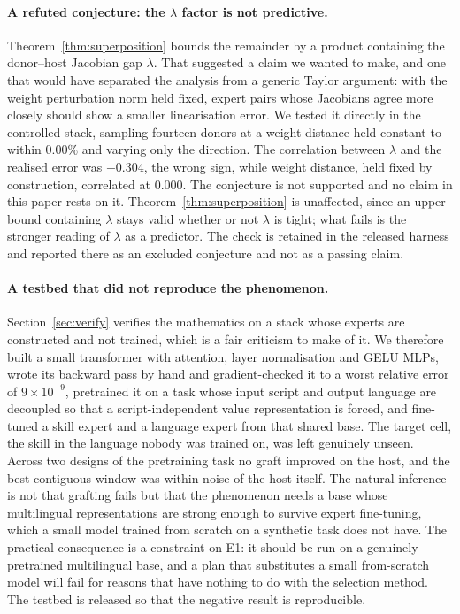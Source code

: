 \documentclass[10pt]{article}
\theoremstyle{plain}
\theoremstyle{definition}
\theoremstyle{remark}
\begin{document}
\paragraph{A refuted conjecture: the $\lambda$ factor is not predictive.}
Theorem~\ref{thm:superposition} bounds the remainder by a product containing the
donor--host Jacobian gap $\lambda$. That suggested a claim we wanted to make, and
one that would have separated the analysis from a generic Taylor argument: with
the weight perturbation norm held fixed, expert pairs whose Jacobians agree more
closely should show a smaller linearisation error. We tested it directly in the
controlled stack, sampling fourteen donors at a weight distance held constant to
within $0.00\%$ and varying only the direction. The correlation between $\lambda$
and the realised error was $-0.304$, the wrong sign, while weight distance, held
fixed by construction, correlated at $0.000$. The conjecture is not supported and
no claim in this paper rests on it. Theorem~\ref{thm:superposition} is unaffected,
since an upper bound containing $\lambda$ stays valid whether or not $\lambda$ is
tight; what fails is the stronger reading of $\lambda$ as a predictor. The check
is retained in the released harness and reported there as an excluded conjecture
and not as a passing claim.

\paragraph{A testbed that did not reproduce the phenomenon.}
Section~\ref{sec:verify} verifies the mathematics on a stack whose experts are
constructed and not trained, which is a fair criticism to make of it. We
therefore built a small transformer with attention, layer normalisation and GELU
MLPs, wrote its backward pass by hand and gradient-checked it to a worst relative
error of $9\times10^{-9}$, pretrained it on a task whose input script and output
language are decoupled so that a script-independent value representation is
forced, and fine-tuned a skill expert and a language expert from that shared
base. The target cell, the skill in the language nobody was trained on, was left
genuinely unseen. Across two designs of the pretraining task no graft improved on
the host, and the best contiguous window was within noise of the host itself. The
natural inference is not that grafting fails but that the phenomenon needs a base
whose multilingual representations are strong enough to survive expert
fine-tuning, which a small model trained from scratch on a synthetic task does not
have. The practical consequence is a constraint on E1: it should be run on a
genuinely pretrained multilingual base, and a plan that substitutes a small
from-scratch model will fail for reasons that have nothing to do with the
selection method. The testbed is released so that the negative result is
reproducible.
\end{document}
